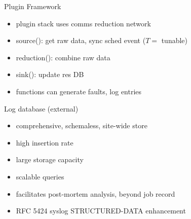 \documentclass[default,pdf,colorBG,slideColor]{prosper}
\begin{document}
\begin{slide}{Plugin Framework}{\small
\begin{center}
\begin{minipage}[b]{0.4\linewidth}
\end{minipage}
\hspace{0.5cm}
\begin{minipage}[b]{0.4\linewidth}
\end{minipage}
\end{center}
\begin{itemize}
  \item{plugin stack uses comms reduction network}
  \item{source(): get raw data, sync sched event ($T=$ tunable)}
  \item{reduction(): combine raw data}
  \item{sink(): update res DB}
  \item{functions can generate faults, log entries}
\end{itemize}
}\end{slide}
\begin{slide}{Log database (external)}{\small
\begin{itemize}
  \item{comprehensive, schemaless, site-wide store}
  \item{high insertion rate}
  \item{large storage capacity}
  \item{scalable queries}
  \item{facilitates post-mortem analysis, beyond job record}
  \item{RFC 5424 syslog STRUCTURED-DATA enhancement}
\end{itemize}
}\end{slide}
\end{document}
